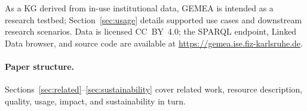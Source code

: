 As a KG derived from in-use institutional data, GEMEA is intended as a research testbed; Section~\ref{sec:usage} details supported use cases and downstream research scenarios.
Data is licensed CC~BY~4.0; the SPARQL endpoint, Linked Data browser, and source code are available at \url{https://gemea.ise.fiz-karlsruhe.de}.

\paragraph{Paper structure.}
Sections~\ref{sec:related}--\ref{sec:sustainability} cover related work, resource description, quality, usage, impact, and sustainability in turn.
